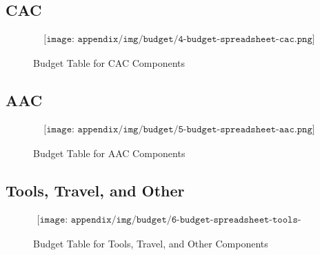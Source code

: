 \begin{landscape}
\subsection{CAC}
\begin{figure}[H]
    \begin{align*}
        \texttt{[image: appendix/img/budget/4-budget-spreadsheet-cac.png]}
    \end{align*}
    \caption{Budget Table for CAC Components}
    \label{fig:budget-table-for-structure-components}
\end{figure}
\end{landscape}


\begin{landscape}
\subsection{AAC}
\begin{figure}[H]
    \begin{align*}
        \texttt{[image: appendix/img/budget/5-budget-spreadsheet-aac.png]}
    \end{align*}
    \caption{Budget Table for AAC Components}
    \label{fig:budget-table-for-aac-components}
\end{figure}
\end{landscape}

\begin{landscape}
\subsection{Tools, Travel, and Other}
\begin{figure}[H]
    \begin{align*}
        \texttt{[image: appendix/img/budget/6-budget-spreadsheet-tools-travel-other.png]}
    \end{align*}
    \caption{Budget Table for Tools, Travel, and Other Components}
    \label{fig:budget-table-for-tools-travel-other-components}
\end{figure}
\end{landscape}